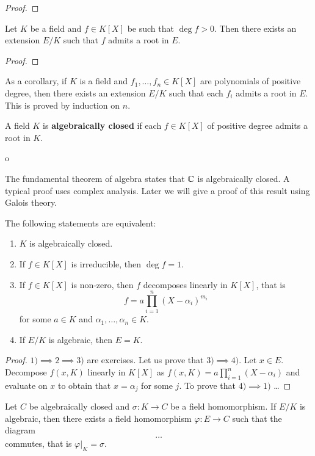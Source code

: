 \begin{proof}
\end{proof}

\begin{theorem}
	Let $K$ be a field and $f\in K[X]$ be such that $\deg f>0$. Then 
	there exists an extension $E/K$ such that $f$ admits a root in $E$. 
\end{theorem}

\begin{proof}
\end{proof}

As a corollary, if $K$ is a field and $f_1,\dots,f_n\in K[X]$ are polynomials 
of positive degree, then there exists an extension $E/K$  such that 
each $f_i$ admits a root in $E$. This is proved by induction on $n$.  

\begin{definition}
	A field $K$ is \textbf{algebraically closed} if each $f\in K[X]$ 
	of positive degree admits a root in $K$. 
\end{definition}o

The fundamental theorem of algebra states that $\mathbb{C}$ is algebraically closed. A
typical proof uses complex analysis.  Later we will give a proof of this result
using Galois theory. 

\begin{proposition}
	The following statements are equivalent:
	\begin{enumerate}
		\item $K$ is algebraically closed.
		\item If $f\in K[X]$ is irreducible, then $\deg f=1$.
		\item If $f\in K[X]$ is non-zero, then $f$ decomposes linearly in $K[X]$, that is
			\[
				f=a\prod_{i=1}^n(X-\alpha_i)^{m_i}
			\]
			for some $a\in K$ and $\alpha_1,\dots,\alpha_n\in K$. 
		\item If $E/K$ is algebraic, then $E=K$. 
	\end{enumerate}
\end{proposition}

\begin{proof}
	$1)\implies 2\implies 3)$ are exercises.
	Let us prove that $3)\implies 4)$. Let $x\in E$. Decompose $f(x,K)$ linearly in $K[X]$ as 
	$f(x,K)=a\prod_{i=1}^n(X-\alpha_i)$ 
	and
evaluate on $x$ to obtain that $x=\alpha_j$ for some $j$. To prove that $4)\implies 1)$ \dots
\end{proof}

\begin{proposition}
	Let $C$ be algebraically closed and $\sigma\colon K\to C$ be a field homomorphism. If $E/K$ 
	is algebraic, then there exists a field homomorphism 
	$\varphi\colon E\to C$ such that 
	the diagram
	\[
		\dots
	\]
	commutes, that is 
	$\varphi|_K=\sigma$. 
\end{proposition}

